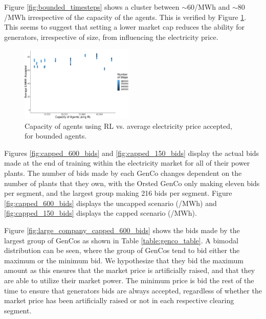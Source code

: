 \documentclass[conference]{IEEEtran}
\begin{document}
Figure \ref{fig:bounded_timesteps} shows a cluster between ${\sim}$\textsterling$60$/MWh and ${\sim}$\textsterling$80$/MWh irrespective of the capacity of the agents. This is verified by Figure \ref{fig:bounded_results_scatter}. This seems to suggest that setting a lower market cap reduces the ability for generators, irrespective of size, from influencing the electricity price.






\begin{figure}
    \includegraphics[width=0.48\textwidth]{figures/results/bounded_results_scatter.pdf}
    \caption{Capacity of agents using RL vs. average electricity price accepted, for bounded agents.}
    \label{fig:bounded_results_scatter}
\end{figure}



Figures \ref{fig:capped_600_bids} and \ref{fig:capped_150_bids} display the actual bids made at the end of training within the electricity market for all of their power plants. The number of bids made by each GenCo changes dependent on the number of plants that they own, with the Orsted GenCo only making eleven bids per segment, and the largest group making 216 bids per segment. Figure \ref{fig:capped_600_bids} displays the uncapped scenario (/MWh) and \ref{fig:capped_150_bids} displays the capped scenario (/MWh).

Figure \ref{fig:large_company_capped_600_bids} shows the bids made by the largest group of GenCos as shown in Table \ref{table:genco_table}. A bimodal distribution can be seen, where the group of GenCos tend to bid either the maximum or the minimum bid. We hypothesize that they bid the maximum amount as this ensures that the market price is artificially raised, and that they are able to utilize their market power. The minimum price is bid the rest of the time to ensure that generators bids are always accepted, regardless of whether the market price has been artificially raised or not in each respective clearing segment.
\end{document}
